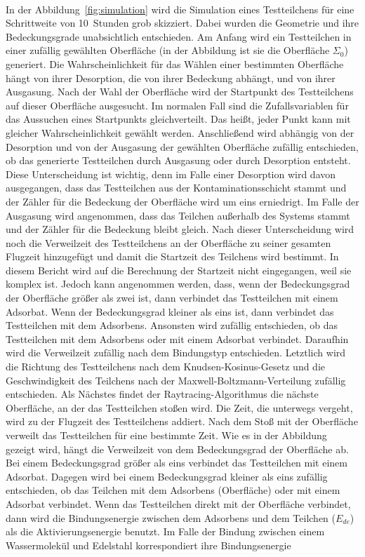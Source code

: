 \documentclass{listhesis}
\begin{document}
\paragraph{}
In der Abbildung~\ref{fig:simulation} wird die Simulation eines Testteilchens für eine Schrittweite von \SI{10}{Stunden} grob skizziert. Dabei wurden die Geometrie und ihre Bedeckungsgrade unabsichtlich entschieden. Am Anfang wird ein Testteilchen in einer zufällig gewählten Oberfläche (in der Abbildung ist sie die Oberfläche $\Sigma_0$) generiert. Die Wahrscheinlichkeit für das Wählen einer bestimmten Oberfläche hängt von ihrer Desorption, die von ihrer Bedeckung abhängt, und von ihrer Ausgasung. Nach der Wahl der Oberfläche wird der Startpunkt des Testteilchens auf dieser Oberfläche ausgesucht. Im normalen Fall sind die Zufallsvariablen für das Aussuchen eines Startpunkts gleichverteilt. Das heißt, jeder Punkt kann mit gleicher Wahrscheinlichkeit gewählt werden. Anschließend wird abhängig von der Desorption und von der Ausgasung der gewählten Oberfläche zufällig entschieden, ob das generierte Testteilchen durch Ausgasung oder durch Desorption entsteht. Diese Unterscheidung ist wichtig, denn im Falle einer Desorption wird davon ausgegangen, dass das Testteilchen aus der Kontaminationsschicht stammt und der Zähler für die Bedeckung der Oberfläche wird um eins erniedrigt. Im Falle der Ausgasung wird angenommen, dass das Teilchen außerhalb des Systems stammt und der Zähler für die Bedeckung bleibt gleich. Nach dieser Unterscheidung wird noch die Verweilzeit des Testteilchens an der Oberfläche zu seiner gesamten Flugzeit hinzugefügt und damit die Startzeit des Teilchens wird bestimmt. In diesem Bericht wird auf die Berechnung der Startzeit nicht eingegangen, weil sie komplex ist. Jedoch kann angenommen werden, dass, wenn der Bedeckungsgrad der Oberfläche größer als zwei ist, dann verbindet das Testteilchen mit einem Adsorbat. Wenn der Bedeckungsgrad kleiner als eins ist, dann verbindet das Testteilchen mit dem Adsorbens. Ansonsten wird zufällig entschieden, ob das Testteilchen mit dem Adsorbens oder mit einem Adsorbat verbindet. Daraufhin wird die Verweilzeit zufällig nach dem Bindungstyp entschieden. Letztlich wird die Richtung des Testteilchens nach dem Knudsen-Kosinus-Gesetz und die Geschwindigkeit des Teilchens nach der Maxwell-Boltzmann-Verteilung zufällig entschieden. Als Nächstes findet der Raytracing-Algorithmus die nächste Oberfläche, an der das Testteilchen stoßen wird. Die Zeit, die unterwegs vergeht, wird zu der Flugzeit des Testteilchens addiert. Nach dem Stoß mit der Oberfläche verweilt das Testteilchen für eine bestimmte Zeit. Wie es in der Abbildung gezeigt wird, hängt die Verweilzeit von dem Bedeckungsgrad der Oberfläche ab. Bei einem Bedeckungsgrad größer als eins verbindet das Testteilchen mit einem Adsorbat. Dagegen wird bei einem Bedeckungsgrad kleiner als eins zufällig entschieden, ob das Teilchen mit dem Adsorbens (Oberfläche) oder mit einem Adsorbat verbindet. Wenn das Testteilchen direkt mit der Oberfläche verbindet, dann wird die Bindungsenergie zwischen dem Adsorbens und dem Teilchen ($E_{de}$) als die Aktivierungsenergie benutzt. Im Falle der Bindung zwischen einem Wassermolekül und Edelstahl korrespondiert ihre Bindungsenergie 
\end{document}
